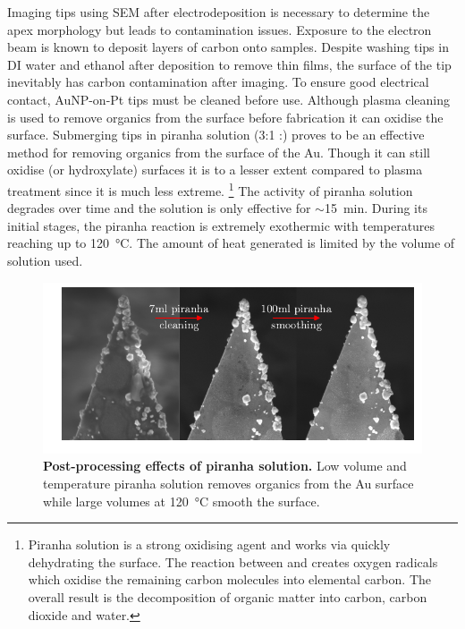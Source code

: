 \documentclass{article}
\begin{document}
Imaging tips using SEM after electrodeposition is necessary to determine the apex morphology but leads to contamination issues. Exposure to the electron beam is known to deposit layers of carbon onto samples. Despite washing tips in DI water and ethanol after deposition to remove thin films, the surface of the tip inevitably has carbon contamination after imaging. To ensure good electrical contact, AuNP-on-Pt tips must be cleaned before use. Although plasma cleaning is used to remove organics from the surface before fabrication it can oxidise the surface. Submerging tips in piranha solution (3:1 :) proves to be an effective method for removing organics from the surface of the Au. Though it can still oxidise {\color{red}(or hydroxylate)} surfaces it is to a lesser extent compared to plasma treatment since it is much less extreme.%
\footnote{Piranha solution is a strong oxidising agent and works via  quickly dehydrating the surface. The reaction between  and  creates oxygen radicals which oxidise the remaining carbon molecules into elemental carbon. The overall result is the decomposition of organic matter into carbon, carbon dioxide and water.} The activity of piranha solution degrades over time and the solution is only effective for $\sim$\SI{15}{\minute}. During its initial stages, the piranha reaction is extremely exothermic with temperatures reaching up to \SI{120}{\celsius}. The amount of heat generated is limited by the volume of solution used.

\begin{figure}[bt]
\centering
\includegraphics[clip=true, trim=20 20 0 0]{figures/tip_post_processing}
\caption[Post-processing effects of piranha solution.]{\textbf{Post-processing effects of piranha solution.} Low volume and temperature piranha solution removes organics from the Au surface while large volumes at \SI{120}{\celsius} smooth the surface.}
\label{fig:tip_post_processing}
\end{figure}
\end{document}
